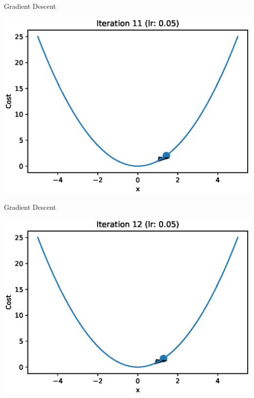 \documentclass{beamer}
\begin{document}
	\begin{frame}{Gradient Descent}
		\begin{center}
			\includegraphics[totalheight=6cm]{gradient-descent/iteration-11.eps}
		\end{center}
	\end{frame}
	
	\begin{frame}{Gradient Descent}
		\begin{center}
			\includegraphics[totalheight=6cm]{gradient-descent/iteration-12.eps}
		\end{center}
	\end{frame}
	
\end{document}
